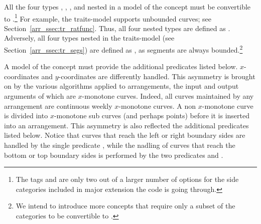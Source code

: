 All the four types ,
, , and
 nested in a model of the concept
 must be convertible to
.\footnote{The tags
   and  are only
  two out of a larger number of options for the side categories
  included in major extension the code is going through.}
For example, the  traits-model supports
unbounded curves; see Section~\ref{arr_ssec:tr_ratfunc}. Thus, all
four nested types are defined as .
Adversely, all four types nested in the 
traits-model (see Section~\ref{arr_ssec:tr_segs}) are defined as
, as segments are always
bounded.\footnote{We intend to introduce more concepts that require
  only a subset of the categories to be convertible to
  .}

A model of the concept  must provide
the additional predicates listed below. 
$x$-coordinates and $y$-coordinates are differently handled. This
asymmetry is brought on by the various algorithms applied to
arrangements, the input and output arguments of which are $x$-monotone
curves. Indeed, all curves maintained by any arrangement are
continuous weekly $x$-monotone curves. A non $x$-monotone curve is
divided into $x$-monotone sub curves (and perhaps points) before it
is inserted into an arrangement. This asymmetry is also reflected the
additional predicates listed below. Notice that curves that reach the
left or right boundary sides are handled by the single predicate
, while the nadling of curves that
reach the bottom or top boundary sides is performed by the two
predicates  and .

